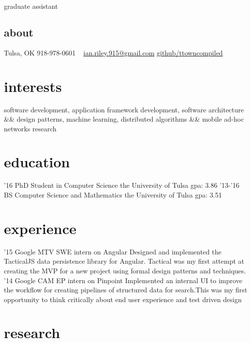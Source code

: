 \documentclass[print]{friggeri-cv}
\begin{document}
       {graduate assistant}


\begin{aside}
  \section{about}
    Tulsa, OK
    918-978-0601
    ~
    \href{mailto:ian.riley.915@gmail.com}{ian.riley.915@gmail.com}
    \href{https://github.com/ttowncompiled}{github/ttowncompiled}
\end{aside}

\section{interests}
software development, application framework development, software architecture \&\& design patterns, machine learning, distributed algorithms \&\& mobile ad-hoc networks research

\section{education}

\begin{entrylist}
  \entry
    {'16}
    {PhD Student in Computer Science}
    {the University of Tulsa}
    {gpa: 3.86}
  \entry
    {'13-'16}
    {BS Computer Science and Mathematics}
    {the University of Tulsa}
    {gpa: 3.51}
\end{entrylist}

\section{experience}

\begin{entrylist}
  \entry
    {'15}
    {Google MTV}
    {SWE intern on Angular}
    {Designed and implemented the TacticalJS data persistence library for Angular. Tactical was my first attempt at creating the MVP for a new project using formal design patterns and techniques.}
  \entry
    {'14}
    {Google CAM}
    {EP intern on Pinpoint}
    {Implemented an internal UI to improve the workflow for creating pipelines of structured data for search.This was my first opportunity to think critically about end user experience and test driven design}
\end{entrylist}

\pagebreak
\section{research}
\end{document}
